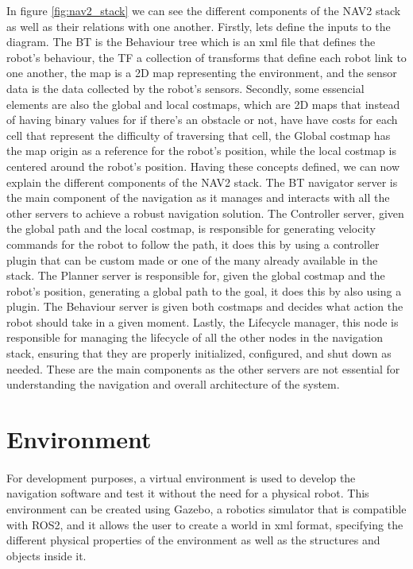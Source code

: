 In figure \ref{fig:nav2_stack} we can see the different components of the \gls{NAV2} stack as well as their 
relations with one another. Firstly, lets define the inputs to the diagram. The BT is the Behaviour tree 
which is an xml file that defines the robot's behaviour, the TF a collection of transforms that define each 
robot link to one another, the map is a 2D map representing the environment, and the sensor data is 
the data collected by the robot's sensors. Secondly, some essencial elements are also the global and local 
costmaps, which are 2D maps that instead of having binary values for if there's an obstacle or not, have 
have costs for each cell that represent the difficulty of traversing that cell, the Global costmap 
has the map origin as a reference for the robot's position, while the local costmap is centered around 
the robot's position. Having these concepts defined, we can now explain the different components of 
the \gls{NAV2} stack. The BT navigator server is the main component of the navigation as it manages 
and interacts with all the other servers to achieve a robust navigation solution. The Controller server, 
given the global path and the local costmap, is responsible for generating velocity commands 
for the robot to follow the path, it does this by using a controller plugin that can be custom made or 
one of the many already available in the stack. The Planner server is responsible for, given the 
global costmap and the robot's position, generating a global path to the goal, it does this by also 
using a plugin. The Behaviour server is given both costmaps and decides what action the robot should take 
in a given moment. Lastly, the Lifecycle manager, this node is responsible for managing the lifecycle of all 
the other nodes in the navigation stack, ensuring that they are properly initialized, configured, and shut 
down as needed. These are the main components as the other servers are not essential for understanding 
the navigation and overall architecture of the system.





\section{Environment}
\label{subsec:environment}
\paragraph{}For development purposes, a virtual environment is used to develop the navigation software 
and test it without the need for a physical robot. This environment can be created using Gazebo, a 
robotics simulator that is compatible with \gls{ROS2}, and it allows the user to create a world in xml format, specifying 
the different physical properties of the environment as well as the structures and objects inside it.

